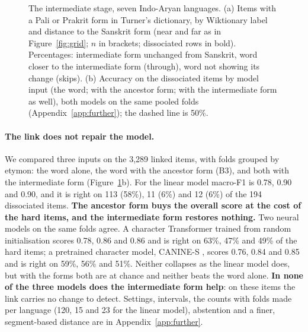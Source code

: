 \documentclass[11pt]{article}
\begin{document}
\begin{figure}[t]
\caption{The intermediate stage, seven Indo-Aryan languages. (a) Items with a Pali or Prakrit form in Turner's dictionary, by Wiktionary label and distance to the Sanskrit form (near and far as in Figure~\ref{fig:grid}; $n$ in brackets; dissociated rows in bold). Percentages: intermediate form unchanged from Sanskrit, word closer to the intermediate form (through), word not showing its change (skips). (b) Accuracy on the dissociated items by model input (the word; with the ancestor form; with the intermediate form as well), both models on the same pooled folds (Appendix~\ref{app:further}); the dashed line is 50\%.}
\label{tab:link}
\end{figure}

\paragraph{The link does not repair the model.} We compared three inputs on the 3,289 linked items, with folds grouped by etymon: the word alone, the word with the ancestor form (B3), and both with the intermediate form (Figure~\ref{tab:link}b). For the linear model macro-F1 is 0.78, 0.90 and 0.90, and it is right on 113 (58\%), 11 (6\%) and 12 (6\%) of the 194 dissociated items. \textbf{The ancestor form buys the overall score at the cost of the hard items, and the intermediate form restores nothing.} Two neural models on the same folds agree. A character Transformer trained from random initialisation scores 0.78, 0.86 and 0.86 and is right on 63\%, 47\% and 49\% of the hard items; a pretrained character model, CANINE-S \citep{clark2022canine}, scores 0.76, 0.84 and 0.85 and is right on 59\%, 56\% and 51\%. Neither collapses as the linear model does, but with the forms both are at chance and neither beats the word alone. \textbf{In none of the three models does the intermediate form help}: on these items the link carries no change to detect. Settings, intervals, the counts with folds made per language (120, 15 and 23 for the linear model), abstention and a finer, segment-based distance are in Appendix~\ref{app:further}.
\end{document}
